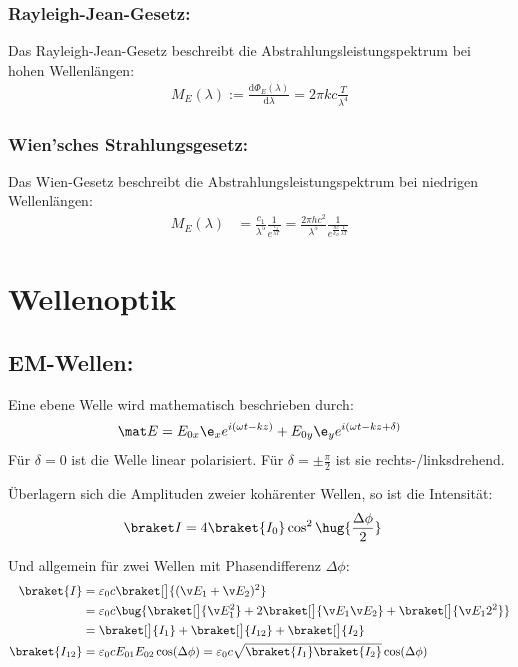 \documentclass[twocolumn, unnumberedsubsub]{summery}
\begin{document}
\subsubsection{Rayleigh-Jean-Gesetz:}
    Das Rayleigh-Jean-Gesetz beschreibt die Abstrahlungsleistungspektrum bei hohen Wellenlängen:
    \begin{align*}
        M_E(\lambda):= \frac{\mathrm  d \Phi_E(\lambda)}{\mathrm d\lambda}=2\pi k c\frac T{\lambda^4}
    \end{align*}

\subsubsection{Wien'sches Strahlungsgesetz:}
    Das Wien-Gesetz beschreibt die Abstrahlungsleistungspektrum bei niedrigen Wellenlängen:
    \begin{align*}
        M_E(\lambda) &= \frac{c_1}{\lambda^5} \frac{1}{e^{\frac{c_2}{\lambda T}}}
        = \frac{2\pi h  c^2}{\lambda^5} \frac{1}{e^{\frac{h c}{k_B}\frac{1}{\lambda T}}}
    \end{align*}

\section{Wellenoptik}
\subsection{EM-Wellen:}
Eine ebene Welle wird mathematisch beschrieben durch:
\begin{align*}
    \mat E = E_{0x} \e_x  e^{i(\omega t - kz)} + E_{0y} \e_y  e^{i(\omega t - kz + \delta)}
\end{align*}
Für \(\delta = 0\) ist die Welle linear polarisiert. Für 
\(\delta = \pm \frac \pi 2\) ist sie rechts-/linksdrehend.

Überlagern sich die Amplituden zweier kohärenter Wellen, so ist die 
Intensität:
\begin{align*}
    \braket I &= 4 \braket{I_0} \cos^2 \hug{\frac{\Delta \phi}{2}}
\end{align*}
 
Und allgemein für zwei Wellen mit Phasendifferenz \(\Delta\phi\):
\begin{align*}
    \braket{I} &= \varepsilon_0 c \braket[\big]{(\v E_1 + \v E_2)^2}\\
    &= \varepsilon_0 c \bug{\braket[\big]{\v E_1^2} + 2\braket[\big]{\v E_1 \v E_2} + \braket[\big]{\v E_12^2}}\\
    &= \braket[\big]{I_1} + \braket[\big]{I_{12}} + \braket[\big]{I_2}\\
    \braket{I_{12}} &= \varepsilon_0 c E_{01} E_{02} \cos(\Delta \phi)
    = \varepsilon_0 c \sqrt{\braket{I_1}\braket{I_2}} \cos(\Delta \phi)
\end{align*}
\end{document}
